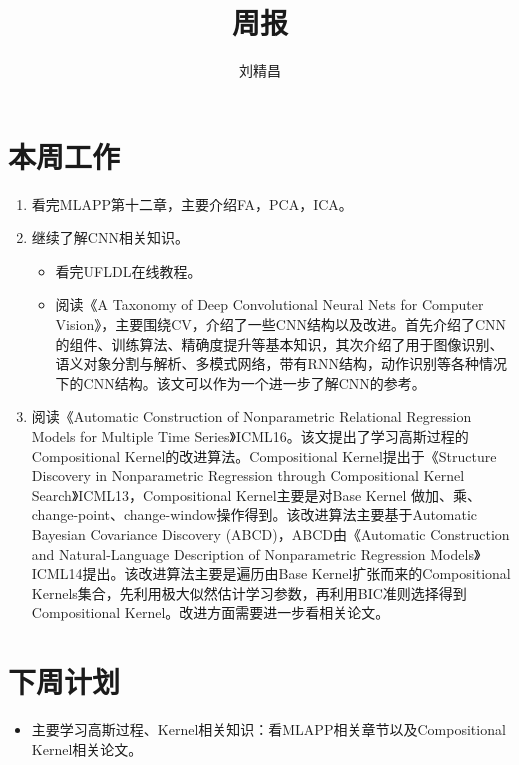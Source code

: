 \documentclass{ctexart}
\begin{document}
\title{周报}
\author{刘精昌}
\maketitle

\fangsong
\section*{本周工作}
\begin{enumerate}
  \item 看完MLAPP第十二章，主要介绍FA，PCA，ICA。
  \item 继续了解CNN相关知识。
    \begin{itemize}
      \item 看完UFLDL在线教程。
      \item 阅读《A Taxonomy of Deep Convolutional Neural Nets for Computer Vision》，主要围绕CV，介绍了一些CNN结构以及改进。首先介绍了CNN的组件、训练算法、精确度提升等基本知识，其次介绍了用于图像识别、语义对象分割与解析、多模式网络，带有RNN结构，动作识别等各种情况下的CNN结构。该文可以作为一个进一步了解CNN的参考。
    \end{itemize}
  \item 阅读《Automatic Construction of Nonparametric Relational Regression Models for
Multiple Time Series》ICML16。该文提出了学习高斯过程的Compositional Kernel的改进算法。Compositional Kernel提出于《Structure Discovery in Nonparametric Regression through Compositional Kernel Search》ICML13，Compositional Kernel主要是对Base Kernel 做加、乘、change-point、change-window操作得到。该改进算法主要基于Automatic Bayesian Covariance Discovery (ABCD)，ABCD由《Automatic Construction and Natural-Language Description of Nonparametric Regression Models》ICML14提出。该改进算法主要是遍历由Base Kernel扩张而来的Compositional Kernels集合，先利用极大似然估计学习参数，再利用BIC准则选择得到Compositional Kernel。改进方面需要进一步看相关论文。

\end{enumerate}

\section*{下周计划}
\begin{itemize}
  \item 主要学习高斯过程、Kernel相关知识：看MLAPP相关章节以及Compositional Kernel相关论文。
\end{itemize}
\end{document}
